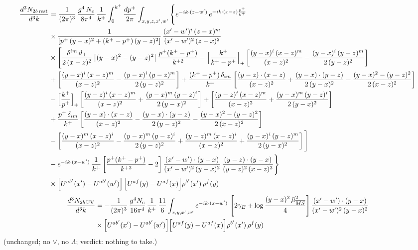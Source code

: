\documentclass[9pt]{article}
\numberwithin{equation}{section}
\begin{document}
\begin{align}
\frac{d^{3}N_{2b\,\rm rest}}{d^{3}k} & =\frac{1}{(2\pi)^{3}}\,\frac{g^{4}\,N_{c}}{8\pi^{4}}\,\frac{1}{k^{+}}\int_{0}^{k^{+}}\frac{dp^{+}}{2\pi}\int_{x,y,z,x',w'}\Bigg\{e^{-ik\cdot(z-w')}\,e^{-ik\cdot(x-z)\frac{p^{+}}{k^{+}}}\notag \\ & \times\frac{1}{\left[p^{+}\,(y-x)^{2}+(k^{+}-p^{+})\,(y-z)^{2}\right]}\,\frac{(x'-w')^{i}\,(z-x)^{m}}{(x'-w')^{2}\,(z-x)^{2}}\notag\\
&\times\Bigg[\frac{\delta^{im}\,d_{\perp}}{2\,(x-z)^{2}}\left[(y-x)^{2}-(y-z)^{2}\right]\frac{p^{+}(k^{+}-p^{+})}{k^{+2}}
-\Big[\frac{k^{+}}{k^{+}-p^{+}}\Big]_{+}\left[\frac{(y-x)^{i}\,(x-z)^{m}}{(x-z)^{2}}-\frac{(y-x)^{i}\,(y-z)^{m}}{2\,(y-z)^{2}}\right]\notag\\
&+\left[\frac{(y-x)^{i}\,(x-z)^{m}}{(x-z)^{2}}-\frac{(y-x)^{i}\,(y-z)^{m}}{2\,(y-z)^{2}}\right]
+\frac{(k^{+}-p^{+})\,\delta_{im}}{k^{+}}\left[\frac{(y-z)\cdot(x-z)}{(x-z)^{2}}+\frac{(y-x)\cdot(y-z)}{2\,(y-x)^{2}}-\frac{(y-x)^{2}-(y-z)^{2}}{2\,(x-z)^{2}}\right]\notag\\
&-\Big[\frac{k^{+}}{p^{+}}\Big]_{+}\left[\frac{(y-z)^{i}\,(x-z)^{m}}{(x-z)^{2}}+\frac{(y-x)^{m}\,(y-z)^{i}}{2\,(y-x)^{2}}\right]+\left[\frac{(y-z)^{i}\,(x-z)^{m}}{(x-z)^{2}}+\frac{(y-x)^{m}\,(y-z)^{i}}{2\,(y-x)^{2}}\right]\notag\\
&+\frac{p^{+}\,\delta_{im}}{k^{+}}\left[\frac{(y-x)\cdot(x-z)}{(x-z)^{2}}-\frac{(y-x)\cdot(y-z)}{2\,(y-z)^{2}}-\frac{(y-x)^{2}-(y-z)^{2}}{2\,(x-z)^{2}}\right]\notag\\
&-\left[\frac{(y-x)^{m}\,(x-z)^{i}}{(x-z)^{2}}-\frac{(y-x)^{m}\,(y-z)^{i}}{2\,(y-z)^{2}}+\frac{(y-z)^{m}\,(x-z)^{i}}{(x-z)^{2}}+\frac{(y-x)^{i}\,(y-z)^{m}}{2\,(y-x)^{2}}\right]\Bigg]\notag\\
&-e^{-ik\cdot(x-w')}\,\frac{1}{k^{+}}\left[\frac{p^{+}(k^{+}-p^{+})}{k^{+2}}-2\right]\frac{(x'-w')\cdot(y-x)}{(x'-w')^{2}\,(y-x)^{2}}\,\frac{(y-z)\cdot(y-x)}{(y-z)^{2}\,(x-z)^{2}}\Bigg\}\notag\\
&\times\Big[U^{ab'}(x')-U^{ab'}(w')\Big]\,\Big[U^{af}(y)-U^{af}(x)\Big]\rho^{b'}(x')\,\rho^{f}(y)
\end{align}
\begin{align} \frac{d^{3}N_{2b\,\rm UV}}{d^{3}k} & =-\frac{1}{(2\pi)^{3}}\,\frac{g^{4}N_{c}}{16\pi^{4}}\,\frac{1}{k^{+}}\,\frac{11}{6}\int_{x,y,x',w'}e^{-ik\cdot(x-w')}\,\left[2\gamma_{E}+\log\frac{(y-x)^{2}\,\bar\mu^{2}_{\overline{MS}}}{4}\right]\frac{(x'-w')\cdot(y-x)}{(x'-w')^{2}\,(y-x)^{2}}\notag \\ & \times\Big[U^{ab'}(x')-U^{ab'}(w')\Big]\Big[U^{af}(y)-U^{af}(x)\Big]\rho^{b'}(x')\,\rho^{f}(y) \end{align}
(unchanged; no $\vee$, no $\Lambda$; verdict: nothing to take.)
\end{document}
